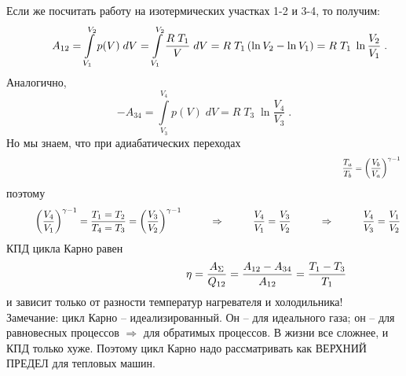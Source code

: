 \documentclass[12pt,epsfig,color,russian]{article}
\begin{document}
Если же посчитать работу на изотермических участках 1-2 и 3-4, то получим:\vspace{-5mm}
\begin{displaymath}
\hspace{10mm}A_{12}=\int\limits_{V_1}^{V_2}p(V)\;dV=
\int\limits_{V_1}^{V_2}\frac{R\;T_1}{V}\;dV=
R\;T_1\left(\ln V_2-\ln V_1\right)=
R\;T_1\;\ln \frac{V_2}{V_1}\;.
\end{displaymath}
Аналогично,\vspace{-5mm}
\begin{displaymath}
-A_{34}=\int\limits_{V_3}^{V_4}p(V)\;dV=
R\;T_3\;\ln \frac{V_4}{V_3}\;.
\end{displaymath}
Но мы знаем, что при адиабатических переходах\vspace{-14mm}
\begin{displaymath}
\hspace{140mm}\frac{T_a}{T_b}=\left(\frac{V_b}{V_a}\right)^{\gamma-1}
\end{displaymath}
поэтому
\begin{displaymath}
\hspace{10mm}\left(\frac{V_4}{V_1}\right)^{\gamma-1}=
\frac{T_1=T_2}{T_4=T_3}=\left(\frac{V_3}{V_2}\right)^{\gamma-1}
\hspace{10mm}\Rightarrow\hspace{10mm}\frac{V_4}{V_1}=\frac{V_3}{V_2}
\hspace{10mm}\Rightarrow\hspace{10mm}\frac{V_4}{V_3}=\frac{V_1}{V_2}
\end{displaymath}
КПД цикла Карно равен\vspace{-5mm}
\begin{displaymath}
\hspace{40mm}\eta=\frac{A_\Sigma}{Q_{12}}=\frac{A_{12}-A_{34}}{A_{12}}=\frac{T_1-T_3}{T_1}
\end{displaymath}
и зависит только от разности температур нагревателя и холодильника!\\

Замечание: цикл Карно -- идеализированный. Он -- для идеального газа; он -- для равновесных процессов $\Rightarrow$ для обратимых процессов. В жизни все сложнее, и КПД только хуже. Поэтому цикл Карно надо рас\-смат\-ри\-вать как ВЕРХНИЙ ПРЕДЕЛ для тепловых машин.\\
\end{document}
